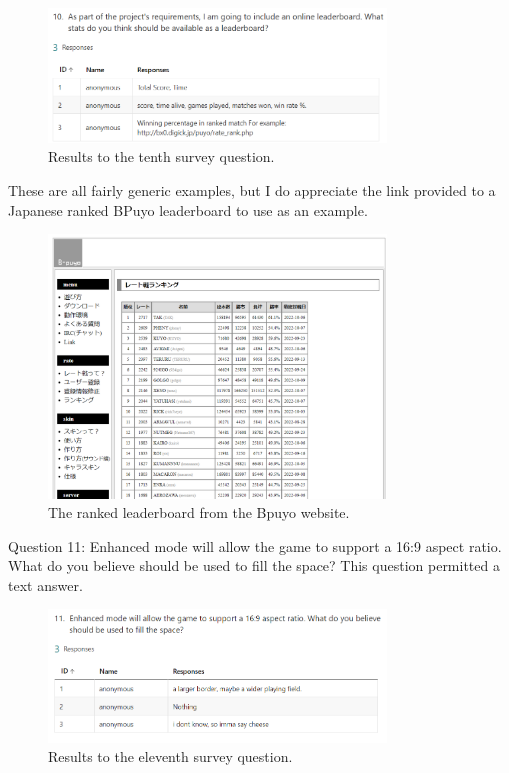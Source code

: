\documentclass{article}
\begin{document}
\begin{figure}[h]
    \centering
    \includegraphics[width=0.8\textwidth]{survey10.png}
    \caption{\label{fig:survey10}Results to the tenth survey question.}
\end{figure}

These are all fairly generic examples, but I do appreciate the link provided to a Japanese ranked BPuyo leaderboard to use as an example.

\begin{figure}[h]
    \centering
    \includegraphics[width=0.8\textwidth]{bpuyo_leaderboard.png}
    \caption{\label{fig:bpuyo_leaderboard}The ranked leaderboard from the Bpuyo website.}
\end{figure}

Question 11: Enhanced mode will allow the game to support a 16:9 aspect ratio. What do you believe should be used to fill the space?
This question permitted a text answer.

\begin{figure}[h]
    \centering
    \includegraphics[width=0.8\textwidth]{survey11.png}
    \caption{\label{fig:survey11}Results to the eleventh survey question.}
\end{figure}
\end{document}

